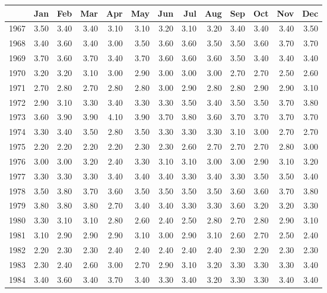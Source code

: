 \begin{longtable}{rrrrrrrrrrrrr}
  \hline
 & Jan & Feb & Mar & Apr & May & Jun & Jul & Aug & Sep & Oct & Nov & Dec \\ 
  \hline
1967 & 3.50 & 3.40 & 3.40 & 3.10 & 3.10 & 3.20 & 3.10 & 3.20 & 3.40 & 3.40 & 3.40 & 3.50 \\ 
  1968 & 3.40 & 3.60 & 3.40 & 3.00 & 3.50 & 3.60 & 3.60 & 3.50 & 3.50 & 3.60 & 3.70 & 3.70 \\ 
  1969 & 3.70 & 3.60 & 3.70 & 3.40 & 3.70 & 3.60 & 3.60 & 3.60 & 3.50 & 3.40 & 3.40 & 3.40 \\ 
  1970 & 3.20 & 3.20 & 3.10 & 3.00 & 2.90 & 3.00 & 3.00 & 3.00 & 2.70 & 2.70 & 2.50 & 2.60 \\ 
  1971 & 2.70 & 2.80 & 2.70 & 2.80 & 2.80 & 3.00 & 2.90 & 2.80 & 2.80 & 2.90 & 2.90 & 3.10 \\ 
  1972 & 2.90 & 3.10 & 3.30 & 3.40 & 3.30 & 3.30 & 3.50 & 3.40 & 3.50 & 3.50 & 3.70 & 3.80 \\ 
  1973 & 3.60 & 3.90 & 3.90 & 4.10 & 3.90 & 3.70 & 3.80 & 3.60 & 3.70 & 3.70 & 3.70 & 3.70 \\ 
  1974 & 3.30 & 3.40 & 3.50 & 2.80 & 3.50 & 3.30 & 3.30 & 3.30 & 3.10 & 3.00 & 2.70 & 2.70 \\ 
  1975 & 2.20 & 2.20 & 2.20 & 2.20 & 2.30 & 2.30 & 2.60 & 2.70 & 2.70 & 2.70 & 2.80 & 3.00 \\ 
  1976 & 3.00 & 3.00 & 3.20 & 2.40 & 3.30 & 3.10 & 3.10 & 3.00 & 3.00 & 2.90 & 3.10 & 3.20 \\ 
  1977 & 3.30 & 3.30 & 3.30 & 3.40 & 3.40 & 3.40 & 3.30 & 3.40 & 3.30 & 3.50 & 3.50 & 3.40 \\ 
  1978 & 3.50 & 3.80 & 3.70 & 3.60 & 3.50 & 3.50 & 3.50 & 3.50 & 3.60 & 3.60 & 3.70 & 3.80 \\ 
  1979 & 3.80 & 3.80 & 3.80 & 2.70 & 3.40 & 3.40 & 3.30 & 3.30 & 3.60 & 3.20 & 3.20 & 3.30 \\ 
  1980 & 3.30 & 3.10 & 3.10 & 2.80 & 2.60 & 2.40 & 2.50 & 2.80 & 2.70 & 2.80 & 2.90 & 3.10 \\ 
  1981 & 3.10 & 2.90 & 2.90 & 2.90 & 3.10 & 3.00 & 2.90 & 3.10 & 2.60 & 2.70 & 2.50 & 2.40 \\ 
  1982 & 2.20 & 2.30 & 2.30 & 2.40 & 2.40 & 2.40 & 2.40 & 2.40 & 2.30 & 2.20 & 2.30 & 2.30 \\ 
  1983 & 2.30 & 2.40 & 2.60 & 3.00 & 2.70 & 2.90 & 3.10 & 3.20 & 3.30 & 3.30 & 3.30 & 3.40 \\ 
  1984 & 3.40 & 3.60 & 3.40 & 3.70 & 3.40 & 3.30 & 3.40 & 3.20 & 3.30 & 3.30 & 3.40 & 3.40 \\ 

\end{longtable}
